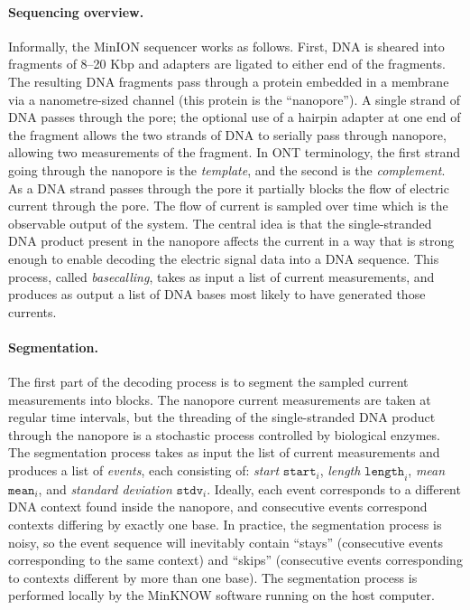 \documentclass{bioinfo}
\begin{document}
\paragraph{Sequencing overview.}
Informally, the MinION sequencer works as follows. First, DNA is sheared into fragments of 8--20 Kbp and adapters are ligated to either end of the fragments. The resulting DNA fragments pass through a protein embedded in a membrane via a nanometre-sized channel (this protein is the ``nanopore''). A single strand of DNA passes through the pore; the optional use of a hairpin adapter at one end of the fragment allows the two strands of DNA to serially pass through nanopore, allowing two measurements of the fragment. In ONT terminology, the first strand going through the nanopore is the \emph{template}, and the second is the \emph{complement}. As a DNA strand passes through the pore it partially blocks the flow of electric current through the pore. The flow of current is sampled over time which is the observable output of the system. The central idea is that the single-stranded DNA product present in the nanopore affects the current in a way that is strong enough to enable decoding the electric signal data into a DNA sequence. This process, called \emph{basecalling}, takes as input a list of current measurements, and produces as output a list of DNA bases most likely to have generated those currents.

\paragraph{Segmentation.}
The first part of the decoding process is to segment the sampled current measurements into blocks. The nanopore current measurements are taken at regular time intervals, but the threading of the single-stranded DNA product through the nanopore is a stochastic process controlled by biological enzymes. The segmentation process takes as input the list of current measurements and produces a list of \emph{events}, each consisting of: \emph{start} $\texttt{start}_i$, \emph{length} $\texttt{length}_i$, \emph{mean} $\texttt{mean}_i$, and \emph{standard deviation} $\texttt{stdv}_i$. Ideally, each event corresponds to a different DNA context found inside the nanopore, and consecutive events correspond contexts differing by exactly one base. In practice, the segmentation process is noisy, so the event sequence will inevitably contain ``stays'' (consecutive events corresponding to the same context) and ``skips'' (consecutive events corresponding to contexts different by more than one base). The segmentation process is performed locally by the MinKNOW software running on the host computer.
\end{document}
